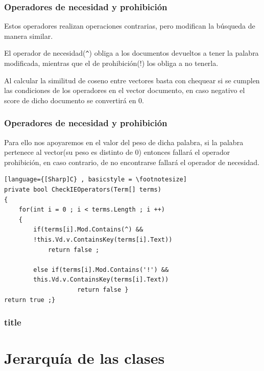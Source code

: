\documentclass{beamer}
\begin{document}
\begin{frame}
    \frametitle{Operadores de necesidad y prohibición}
    Estos operadores realizan operaciones contrarias, pero modifican la búsqueda de manera similar.

    El operador de necesidad(\texttt{\^{}}) obliga a los documentos devueltos a tener la palabra modificada, mientras que 
    el de prohibición(!) los obliga a no tenerla.

    Al calcular la similitud de coseno entre vectores basta con chequear si se cumplen las condiciones de los operadores en 
    el vector documento, en caso negativo el score de dicho documento se convertirá en 0.


\end{frame}

\begin{frame}[fragile]
    \frametitle{Operadores de necesidad y prohibición}
    Para ello nos apoyaremos en el valor del peso de dicha palabra, si la palabra pertenece al vector(su peso es distinto de 0)
    entonces fallará el operador prohibición, en caso contrario, de no encontrarse fallará el operador de necesidad.

    \begin{lstlisting}[language={[Sharp]C} , basicstyle = \footnotesize]
private bool CheckIEOperators(Term[] terms)
{
    for(int i = 0 ; i < terms.Length ; i ++)
    {
        if(terms[i].Mod.Contains(^) && 
        !this.Vd.v.ContainsKey(terms[i].Text))
            return false ;
                
        else if(terms[i].Mod.Contains('!') && 
        this.Vd.v.ContainsKey(terms[i].Text))
                    return false }
return true ;}
    \end{lstlisting}
\end{frame}

\begin{frame}
    \frametitle{title}
\end{frame}

\section{Jerarquía de las clases}
\end{document}
